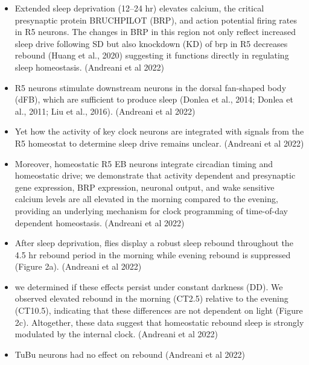 \documentclass[11pt]{article}
\begin{document}
\begin{itemize}
    \item Extended sleep deprivation (12–24 hr) elevates calcium, the critical presynaptic protein BRUCHPILOT (BRP), and action potential firing rates in R5 neurons. The changes in BRP in this region not only reflect increased sleep drive following SD but also knockdown (KD) of brp in R5 decreases rebound (Huang et al., 2020) suggesting it functions directly in regulating sleep homeostasis.
    \cite{andreaniCircadianProgrammingEllipsoid2022} (Andreani et al 2022)

    \item R5 neurons stimulate downstream neurons in the dorsal fan-shaped body (dFB), which are sufficient to produce sleep (Donlea et al., 2014; Donlea et al., 2011; Liu et al., 2016).
    \cite{andreaniCircadianProgrammingEllipsoid2022} (Andreani et al 2022)

    \item Yet how the activity of key clock neurons are integrated with signals from the R5 homeostat to determine sleep drive remains unclear.
    \cite{andreaniCircadianProgrammingEllipsoid2022} (Andreani et al 2022)

    \item Moreover, homeostatic R5 EB neurons integrate circadian timing and homeostatic drive; we demonstrate that activity dependent and presynaptic gene expression, BRP expression, neuronal output, and wake sensitive calcium levels are all elevated in the morning compared to the evening, providing an underlying mechanism for clock programming of time-of-day dependent homeostasis.
    \cite{andreaniCircadianProgrammingEllipsoid2022} (Andreani et al 2022)

    \item After sleep deprivation, flies display a robust sleep rebound throughout the 4.5 hr rebound period in the morning while evening rebound is suppressed (Figure 2a).
    \cite{andreaniCircadianProgrammingEllipsoid2022} (Andreani et al 2022)

    \item we determined if these effects persist under constant darkness (DD). We observed elevated rebound in the morning (CT2.5) relative to the evening (CT10.5), indicating that these differences are not dependent on light (Figure 2c). Altogether, these data suggest that homeostatic rebound sleep is strongly modulated by the internal clock.
    \cite{andreaniCircadianProgrammingEllipsoid2022} (Andreani et al 2022)

    \item TuBu neurons had no effect on rebound
    \cite{andreaniCircadianProgrammingEllipsoid2022} (Andreani et al 2022)


\end{itemize}
\end{document}
